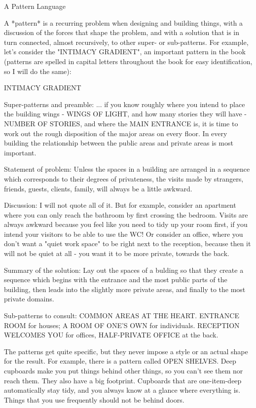 A Pattern Language

A *pattern* is a recurring problem when designing and building things, with a discussion of the forces that shape the problem, and with a solution that is in turn connected, almost recursively, to other super- or sub-patterns.  For example, let's consider the "INTIMACY GRADIENT", an important pattern in the book (patterns are spelled in capital letters throughout the book for easy identification, so I will do the same):

INTIMACY GRADIENT

Super-patterns and preamble:  ... if you know roughly where you intend to place the building wings - WINGS OF LIGHT, and how many stories they will have - NUMBER OF STORIES, and where the MAIN ENTRANCE is, it is time to work out the rough disposition of the major areas on every floor.  In every building the relationship between the public areas and private areas is most important.

Statement of problem: Unless the spaces in a building are arranged in a sequence which corresponds to their degrees of privateness, the visits made by strangers, friends, guests, clients, family, will always be a little awkward.

Discussion:  I will not quote all of it.  But for example, consider an apartment where you can only reach the bathroom by first crossing the bedroom.  Visits are always awkward because you feel like you need to tidy up your room first, if you intend your visitors to be able to use the WC!  Or consider an office, where you don't want a "quiet work space" to be right next to the reception, because then it will not be quiet at all - you want it to be more private, towards the back.

Summary of the solution: Lay out the spaces of a bulding so that they create a sequence which begins with the entrance and the most public parts of the building, then leads into the slightly more private areas, and finally to the most private domains.

Sub-patterns to consult: COMMON AREAS AT THE HEART.  ENTRANCE ROOM for houses; A ROOM OF ONE'S OWN for individuals.  RECEPTION WELCOMES YOU for offices, HALF-PRIVATE OFFICE at the back.

The patterns get quite specific, but they never impose a style or an actual shape for the result.  For example, there is a pattern called OPEN SHELVES.  Deep cupboards make you put things behind other things, so you can't see them nor reach them.  They also have a big footprint. Cupboards that are one-item-deep automatically stay tidy, and you always know at a glance where everything is.  Things that you use frequently should not be behind doors.

